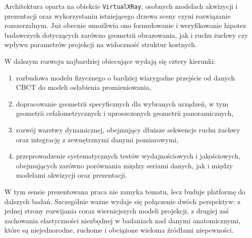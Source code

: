 \documentclass[11pt,a4paper]{article}
\begin{document}
Architektura oparta na obiekcie \texttt{VirtualXRay}, osobnych modelach akwizycji
i prezentacji oraz wykorzystaniu istniejącego drzewa sceny czyni rozwiązanie
rozszerzalnym. Już obecnie umożliwia ono formułowanie i weryfikowanie hipotez
badawczych dotyczących zarówno geometrii obrazowania, jak i ruchu żuchwy czy
wpływu parametrów projekcji na widoczność struktur kostnych.

W dalszym rozwoju najbardziej obiecujące wydają się cztery kierunki:
\begin{enumerate}[label=\arabic*.]
\item rozbudowa modelu fizycznego o bardziej wiarygodne przejście od danych CBCT
      do modeli osłabienia promieniowania,
\item dopracowanie geometrii specyficznych dla wybranych urządzeń, w tym geometrii
      cefalometrycznych i uproszczonych geometrii panoramicznych,
\item rozwój warstwy dynamicznej, obejmujący dłuższe sekwencje ruchu żuchwy
      oraz integrację z zewnętrznymi danymi pomiarowymi,
\item przeprowadzenie systematycznych testów wydajnościowych i jakościowych,
      obejmujących zarówno porównania między seriami danych, jak i między modelami
      akwizycji oraz prezentacji.
\end{enumerate}

W tym sensie prezentowana praca nie zamyka tematu, lecz buduje platformę do dalszych
badań. Szczególnie ważne wydaje się połączenie dwóch perspektyw: z jednej strony
rozwijania coraz wierniejszych modeli projekcji, z drugiej zaś zachowania elastyczności
niezbędnej w badaniach nad danymi anatomicznymi, które są niejednorodne, ruchome
i obciążone wieloma źródłami niepewności.

\printbibliography[title={Literatura}]
\end{document}
